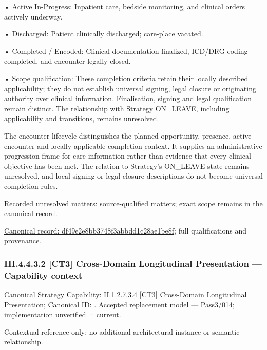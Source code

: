 •
Active In-Progress: Inpatient care, bedside monitoring, and clinical orders actively underway.



•
Discharged: Patient clinically discharged; care-place vacated.



•
Completed / Encoded: Clinical documentation finalized, ICD/DRG coding completed, and encounter legally closed.



•
Scope qualification: These completion criteria retain their locally described applicability; they do not establish universal signing, legal closure or originating authority over clinical information. Finalisation, signing and legal qualification remain distinct. The relationship with Strategy ON\_LEAVE, including applicability and transitions, remains unresolved.



The encounter lifecycle distinguishes the planned opportunity, presence, active encounter and locally applicable completion context. It supplies an administrative progression frame for care information rather than evidence that every clinical objective has been met. The relation to Strategy's ON\_LEAVE state remains unresolved, and local signing or legal-closure descriptions do not become universal completion rules.


{\small Recorded unresolved matters: source-qualified matters; exact scope remains in the canonical record.}\par
{\footnotesize \href{../../../../../../../../continuum/business/business-process/df49e2e8bb3748f3abbdd1c28ae1be8f.md}{Canonical record: df49e2e8bb3748f3abbdd1c28ae1be8f}; full qualifications and provenance.}\par
\subsubsection*{III.4.4.3.2 [CT3] Cross-Domain Longitudinal Presentation — Capability context}
\label{navigation:III.4.4.3.2}

{\small Canonical Strategy Capability: II.1.2.7.3.4 \hyperref[element:81161f005d8f40c8a552e1138c192819]{[CT3] Cross-Domain Longitudinal Presentation}; Canonical ID: \texttt{}. Accepted replacement model — Pass3/014; implementation unverified · current.}\par
Contextual reference only; no additional architectural instance or semantic relationship.\par
